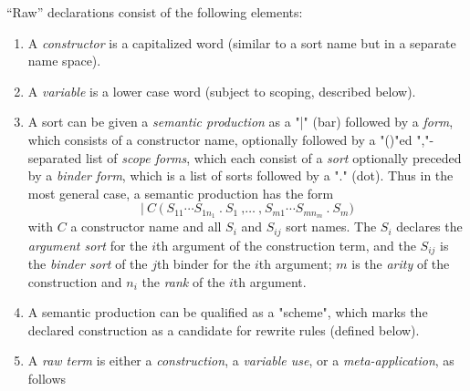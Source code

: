 \documentclass[11pt]{article} %
\begin{document}
\begin{manual}\label{man:raw}
  ``Raw'' declarations consist of the following elements:
  \begin{enumerate}

  \item A \emph{constructor} is a capitalized word (similar to a sort name but in a separate name
    space).

  \item A \emph{variable} is a lower case word (subject to scoping, described below).

  \item A sort can be given a \emph{semantic production} as a "|" (bar) followed by a \emph{form},
    which consists of a constructor name, optionally followed by a "()"ed ","-separated list of
    \emph{scope forms}, which each consist of a \emph{sort} optionally preceded by a \emph{binder
      form}, which is a list of sorts followed by a "." (dot). Thus in the most general case, a
    semantic production has the form
    \begin{equation*}
      \texttt{|}~C~\texttt{(}
      ~S_{11}\cdots S_{1n_1}~\texttt{.}~S_1~\texttt{,}
      …~\texttt{,}
      ~S_{m1}\cdots S_{mn_m}~\texttt{.}~S_m
      \texttt{)}
    \end{equation*}
    with $C$ a constructor name and all $S_i$ and $S_{ij}$ sort names. The $S_i$ declares the
    \emph{argument sort} for the $i$th argument of the construction term, and the $S_{ij}$ is the
    \emph{binder sort} of the $j$th binder for the $i$th argument; $m$ is the \emph{arity} of the
    construction and $n_i$ the \emph{rank} of the $i$th argument.

  \item A semantic production can be qualified as a "scheme", which marks the declared construction
    as a candidate for rewrite rules (defined below).

  \item A \emph{raw term} is either a \emph{construction}, a \emph{variable use}, or a
    \emph{meta-application}, as follows
    \begin{enumerate}


\end{enumerate}
\end{enumerate}
\end{manual}
\end{document}
